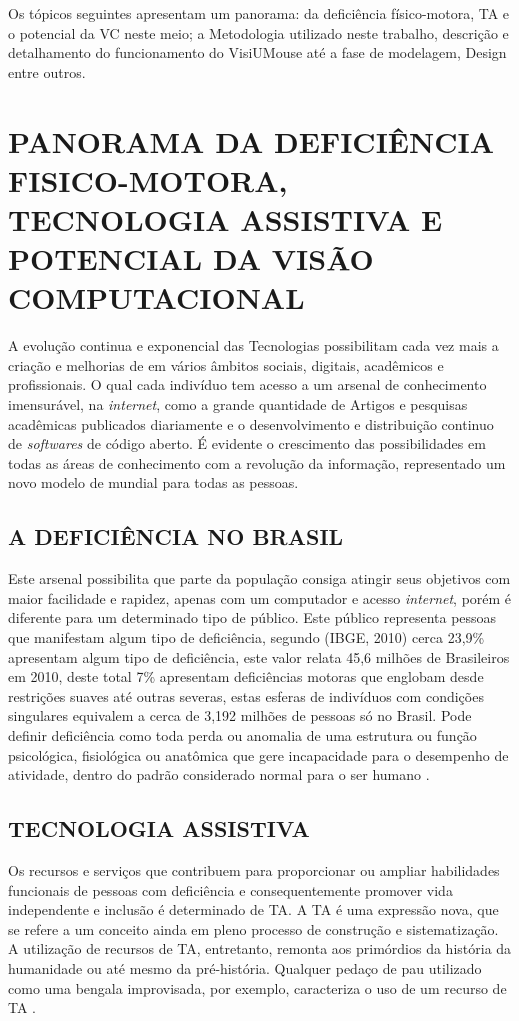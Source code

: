 Os tópicos seguintes apresentam um panorama: da deficiência físico-motora, TA e o potencial da VC neste meio; a Metodologia utilizado neste trabalho, descrição e detalhamento do funcionamento do VisiUMouse até a fase de modelagem, Design entre outros.


\chapter{PANORAMA DA DEFICIÊNCIA FISICO-MOTORA, TECNOLOGIA ASSISTIVA E POTENCIAL DA VISÃO COMPUTACIONAL}
\label{CAP2}

A evolução continua e exponencial das Tecnologias possibilitam cada vez mais a criação e melhorias de em vários âmbitos sociais, digitais, acadêmicos e profissionais. O qual cada indivíduo tem acesso a um arsenal de conhecimento imensurável, na \textit{internet}, como a grande quantidade de Artigos e pesquisas acadêmicas publicados diariamente e o desenvolvimento e distribuição continuo de \textit{softwares} de código aberto. É evidente o crescimento das possibilidades em todas as áreas de conhecimento com a revolução da informação, representado um novo modelo de mundial para todas as pessoas.


\section{A DEFICIÊNCIA NO BRASIL}\label{Sub:deficiencia-brasil}

Este arsenal possibilita que parte da população consiga atingir seus objetivos com maior facilidade e rapidez, apenas com um computador e acesso \textit{internet}, porém é diferente para um determinado tipo de público. Este público representa pessoas que manifestam algum tipo de deficiência, segundo (IBGE, 2010) cerca 23,9\% apresentam algum tipo de deficiência, este valor relata 45,6 milhões de Brasileiros em 2010, deste total 7\% apresentam deficiências motoras que englobam desde restrições suaves até outras severas, estas esferas de indivíduos com condições singulares equivalem a cerca de 3,192 milhões de pessoas só no Brasil. 
Pode definir deficiência como toda perda ou anomalia de uma estrutura ou função psicológica, fisiológica ou anatômica que gere incapacidade para o desempenho de atividade, dentro do padrão considerado normal para o ser humano .

\section{TECNOLOGIA ASSISTIVA}\label{Sub:ta-brasil}
Os recursos e serviços que contribuem para proporcionar ou ampliar habilidades funcionais de pessoas com deficiência e consequentemente promover vida independente e inclusão é determinado de TA. A TA é uma expressão nova, que se refere a um conceito ainda em pleno processo de construção e sistematização. A utilização de recursos de TA, entretanto, remonta aos primórdios da história da humanidade ou até mesmo da pré-história. Qualquer pedaço de pau utilizado como uma bengala improvisada, por exemplo, caracteriza o uso de um recurso de TA .

